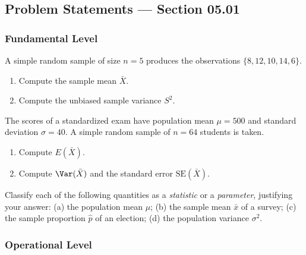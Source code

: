 
\subsection*{Problem Statements --- Section 05.01}

\subsubsection*{Fundamental Level}

\begin{problema}
	\label{prob:5.1.1}
	A simple random sample of size $n=5$ produces the observations $\{8, 12, 10, 14, 6\}$.
	\begin{enumerate}
		\item Compute the sample mean $\bar{X}$.
		\item Compute the unbiased sample variance $S^{2}$.
	\end{enumerate}
\end{problema}

\begin{problema}
	\label{prob:5.1.2}
	The scores of a standardized exam have population mean $\mu = 500$ and standard deviation $\sigma = 40$. A simple random sample of $n = 64$ students is taken.
	\begin{enumerate}
		\item Compute $E(\bar{X})$.
		\item Compute $\Var(\bar{X})$ and the standard error $\text{SE}(\bar{X})$.
	\end{enumerate}
\end{problema}

\begin{problema}
	\label{prob:5.1.3}
	Classify each of the following quantities as a \emph{statistic} or a \emph{parameter}, justifying your answer: (a) the population mean $\mu$; (b) the sample mean $\bar{x}$ of a survey; (c) the sample proportion $\hat{p}$ of an election; (d) the population variance $\sigma^{2}$.
\end{problema}

\subsubsection*{Operational Level}

